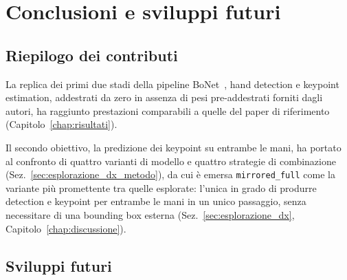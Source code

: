 \chapter{Conclusioni e sviluppi futuri}
\label{chap:conclusioni}

\section{Riepilogo dei contributi}

La replica dei primi due stadi della pipeline BoNet~\cite{escobar2019bonet},
hand detection e keypoint estimation, addestrati da zero in assenza di
pesi pre-addestrati forniti dagli autori, ha raggiunto prestazioni
comparabili a quelle del paper di riferimento
(Capitolo~\ref{chap:risultati}).

Il secondo obiettivo, la predizione dei keypoint su entrambe le mani, ha
portato al confronto di quattro varianti di modello e quattro strategie
di combinazione (Sez.~\ref{sec:esplorazione_dx_metodo}), da cui è
emersa \texttt{mirrored\_full} come la variante più promettente tra
quelle esplorate: l'unica in grado di produrre detection e keypoint per
entrambe le mani in un unico passaggio, senza necessitare di una
bounding box esterna
(Sez.~\ref{sec:esplorazione_dx}, Capitolo~\ref{chap:discussione}).

\section{Sviluppi futuri}
